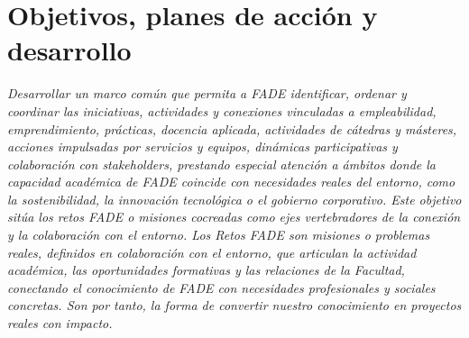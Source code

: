 \documentclass[11pt,a4paper]{scrreprt}
\begin{document}
\section{Objetivos, planes de acción y desarrollo}
\newpage
{}
{\small\color{mutedcolor}\itshape Desarrollar un marco común que permita a FADE identificar, ordenar y coordinar las iniciativas, actividades y conexiones vinculadas a empleabilidad, emprendimiento, prácticas, docencia aplicada, actividades de cátedras y másteres, acciones impulsadas por servicios y equipos, dinámicas participativas y colaboración con stakeholders, prestando especial atención a ámbitos donde la capacidad académica de FADE coincide con necesidades reales del entorno, como la sostenibilidad, la innovación tecnológica o el gobierno corporativo. Este objetivo sitúa los retos FADE o misiones cocreadas como ejes vertebradores de la conexión y la colaboración con el entorno.  Los Retos FADE son misiones o problemas reales, definidos en colaboración con el entorno, que articulan la actividad académica, las oportunidades formativas y las relaciones de la Facultad, conectando el conocimiento de FADE con necesidades profesionales y sociales concretas. Son por tanto, la forma de convertir nuestro conocimiento en proyectos reales con impacto. }\par\vspace{6pt}
\end{document}
